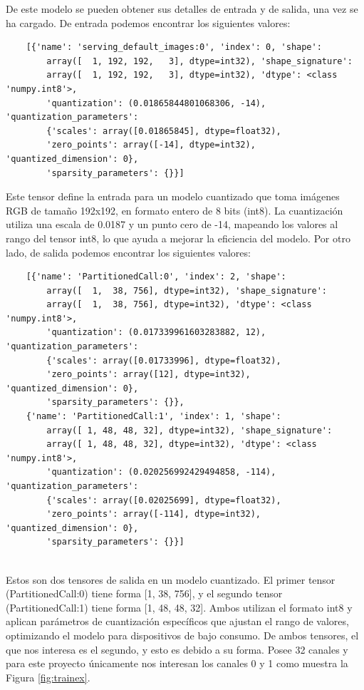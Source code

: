 De este modelo se pueden obtener sus detalles de entrada y de salida, una vez se ha cargado. De entrada podemos encontrar los siguientes valores: 

\begin{verbatim}
	[{'name': 'serving_default_images:0', 'index': 0, 'shape': 
		array([  1, 192, 192,   3], dtype=int32), 'shape_signature': 
		array([  1, 192, 192,   3], dtype=int32), 'dtype': <class 'numpy.int8'>, 
		'quantization': (0.01865844801068306, -14), 'quantization_parameters': 
		{'scales': array([0.01865845], dtype=float32), 
		'zero_points': array([-14], dtype=int32), 'quantized_dimension': 0}, 
		'sparsity_parameters': {}}]
\end{verbatim}

Este tensor define la entrada para un modelo cuantizado que toma imágenes RGB de tamaño 192x192, en formato entero de 8 bits (int8). La cuantización utiliza una escala de 0.0187 y un punto cero de -14, mapeando los valores al rango del tensor int8, lo que ayuda a mejorar la eficiencia del modelo. Por otro lado, de salida podemos encontrar los siguientes valores: 

\begin{verbatim}
	[{'name': 'PartitionedCall:0', 'index': 2, 'shape': 
		array([  1,  38, 756], dtype=int32), 'shape_signature': 
		array([  1,  38, 756], dtype=int32), 'dtype': <class 'numpy.int8'>,
		'quantization': (0.017339961603283882, 12), 'quantization_parameters':
		{'scales': array([0.01733996], dtype=float32), 
		'zero_points': array([12], dtype=int32), 'quantized_dimension': 0},
	  	'sparsity_parameters': {}},
	{'name': 'PartitionedCall:1', 'index': 1, 'shape': 
		array([ 1, 48, 48, 32], dtype=int32), 'shape_signature': 
		array([ 1, 48, 48, 32], dtype=int32), 'dtype': <class 'numpy.int8'>, 
		'quantization': (0.020256992429494858, -114), 'quantization_parameters': 
		{'scales': array([0.02025699], dtype=float32), 
		'zero_points': array([-114], dtype=int32), 'quantized_dimension': 0},
		'sparsity_parameters': {}}]
		
\end{verbatim}


Estos son dos tensores de salida en un modelo cuantizado. El primer tensor (PartitionedCall:0) tiene forma [1, 38, 756], y el segundo tensor (PartitionedCall:1) tiene forma [1, 48, 48, 32]. Ambos utilizan el formato int8 y aplican parámetros de cuantización específicos que ajustan el rango de valores, optimizando el modelo para dispositivos de bajo consumo. De ambos tensores, el que nos interesa es el segundo, y esto es debido a su forma. Posee 32 canales y para este proyecto únicamente nos interesan los canales 0 y 1 como muestra la Figura \ref{fig:trainex}.

